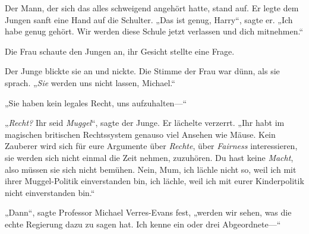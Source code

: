 Der Mann, der sich das alles schweigend angehört hatte, stand auf. Er legte dem Jungen sanft eine Hand auf die Schulter. „Das ist genug, Harry“, sagte er. „Ich habe genug gehört. Wir werden diese Schule jetzt verlassen und dich mitnehmen.“

Die Frau schaute den Jungen an, ihr Gesicht stellte eine Frage.

Der Junge blickte sie an und nickte. Die Stimme der Frau war dünn, als sie sprach. „\emph{Sie} werden uns nicht lassen, Michael.“

„Sie haben kein legales Recht, uns aufzuhalten—“

„\emph{Recht?} Ihr seid \emph{Muggel}“, sagte der Junge. Er lächelte verzerrt. „Ihr habt im magischen britischen Rechtssystem genauso viel Ansehen wie Mäuse. Kein Zauberer wird sich für eure Argumente über \emph{Rechte}, über \emph{Fairness} interessieren, sie werden sich nicht einmal die Zeit nehmen, zuzuhören. Du hast keine \emph{Macht}, also müssen sie sich nicht bemühen. Nein, Mum, ich lächle nicht so, weil ich mit ihrer Muggel-Politik einverstanden bin, ich lächle, weil ich mit eurer Kinderpolitik nicht einverstanden bin.“

„Dann“, sagte Professor Michael Verres-Evans fest, „werden wir sehen, was die echte Regierung dazu zu sagen hat. Ich kenne ein oder drei Abgeordnete—“


